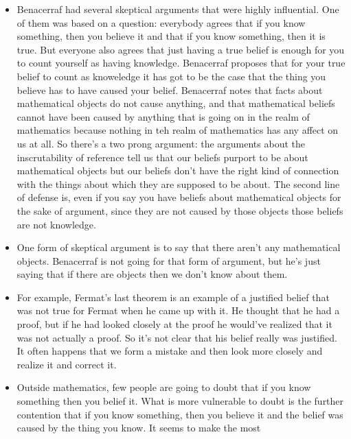 \documentclass[12pt]{article}
\theoremstyle{definition}
\begin{document}
\begin{itemize}
    \itemsep0em 
    \item
        Benacerraf had several skeptical arguments that were highly
        influential. One of them was based on a question: everybody agrees that
        if you know something, then you believe it and that if you know
        something, then it is true. But everyone also agrees that just having a
        true belief is enough for you to count yourself as having knowledge.
        Benacerraf proposes that for your true belief to count as knoweledge it
        has got to be the case that the thing you believe has to have caused
        your belief. Benacerraf notes that facts about mathematical objects do
        not cause anything, and that mathematical beliefs cannot have been
        caused by anything that is going on in the realm of mathematics because
        nothing in teh realm of mathematics has any affect on us at all. So
        there's a two prong argument: the arguments about the inscrutability of
        reference tell us that our beliefs purport to be about mathematical
        objects but our beliefs don't have the right kind of connection with
        the things about which they are supposed to be about. The second line
        of defense is, even if you say you have beliefs about mathematical
        objects for the sake of argument, since they are not caused by those
        objects those beliefs are not knowledge.
    \item
        One form of skeptical argument is to say that there aren't any
        mathematical objects. Benacerraf is not going for that form of
        argument, but he's just saying that if there are objects then we don't
        know about them.
    \item
        For example, Fermat's last theorem is an example of a justified belief
        that was not true for Fermat when he came up with it. He thought that
        he had a proof, but if he had looked closely at the proof he would've
        realized that it was not actually a proof. So it's not clear that his
        belief really was justified. It often happens that we form a mistake
        and then look more closely and realize it and correct it.
    \item
        Outside mathematics, few people are going to doubt that if you know
        something then you belief it. What is more vulnerable to doubt is the
        further contention that if you know something, then you believe it and
        the belief was caused by the thing you know. It seems to make the most

\end{itemize}
\end{document}
